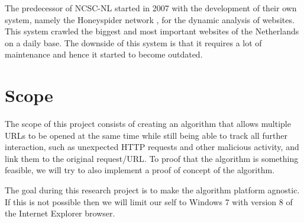 \documentclass{scrartcl}
\begin{document}
The predecessor of NCSC-NL started in 2007 with the development of their own system, namely the Honeyspider network \cite{honeyspider}, for the dynamic analysis of websites. This system crawled the biggest and most important websites of the Netherlands on a daily base. The downside of this system is that it requires a lot of maintenance and hence it started to become outdated.





\section{Scope}

The scope of this project consists of creating an algorithm that allows multiple URLs to be opened at the same time while still being able to track all further interaction, such as unexpected HTTP requests and other malicious activity, and link them to the original request/URL. To proof that the algorithm is something feasible, we will try to also implement a proof of concept of the algorithm.

The goal during this research project is to make the algorithm platform agnostic. If this is not possible then we will limit our self to Windows 7 with version 8 of the Internet Explorer browser.
\end{document}
